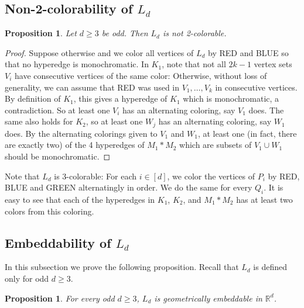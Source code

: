 \documentclass{article}
\newcommand{\RR}{\mathbb{R}}
\newtheorem{prop}[thm]{Proposition}
\theoremstyle{definition}
\begin{document}
\subsection{Non-2-colorability of \texorpdfstring{$L_d$}{Ld}}
\begin{prop} \label{prop_Ld_not-2-colorable}
Let $d\ge 3$ be odd. Then 	
 $L_d$ is not 2-colorable.
\end{prop}
\begin{proof}
	Suppose otherwise and we color all vertices of $L_d$ by RED and BLUE so that no hyperedge is monochromatic. In $K_1$, note that not all $2k-1$ vertex sets $V_i$ have consecutive vertices of the same color: Otherwise, without loss of generality, we can assume that RED was used in $V_1, \dots, V_k$ in consecutive vertices. By definition of $K_1$, this gives a hyperedge of $K_1$ which is monochromatic, a contradiction. So at least one $V_i$ has an alternating coloring, say $V_1$ does. The same also holds for $K_2$, so at least one $W_j$ has an alternating coloring, say $W_1$ does. By the alternating colorings given to $V_1$ and $W_1$, at least one (in fact, there are exactly two) of the 4 hyperedges of $M_1 * M_2$ which are subsets of $V_1\cup W_1$ should be monochromatic. \end{proof}

Note that $L_d$ is 3-colorable: For each $i \in [d]$, we color the vertices of $P_i$ by RED, BLUE and GREEN alternatingly in order. We do the same for every $Q_i$. It is easy to see that each of the hyperedges in $K_1$, $K_2$, and $M_1*M_2$ has at least two colors from this coloring.


\subsection{Embeddability of \texorpdfstring{$L_d$}{Ld}}
In this subsection we prove the following proposition. Recall that $L_d$ is defined only for odd $d\geq 3$.
\begin{prop} \label{prop_Ld_embeddable}
For every odd $d\ge 3$, 	
	$L_d$ is geometrically embeddable in $\RR^d$. 
\end{prop}
\end{document}
